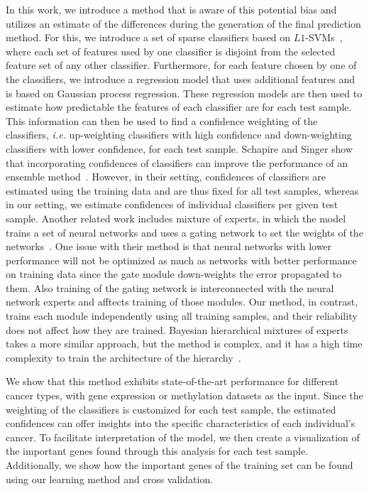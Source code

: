 In this work, we introduce a method that is aware of this potential bias and utilizes an estimate of the differences during the generation of the final prediction method. For this, we introduce a set of sparse classifiers based on $L1$-SVMs~\cite{bradley1998feature}, where each set of features used by one classifier is disjoint from the selected feature set of any other classifier. Furthermore, for each feature chosen by one of the classifiers, we introduce a regression model that uses additional features and is based on Gaussian process regression. These regression models are then used to estimate how predictable the features of each classifier are for each test sample. This information can then be used to find a confidence weighting of the classifiers, \emph{i.e.} up-weighting classifiers with high confidence and down-weighting classifiers with lower confidence, for each test sample. Schapire and Singer show that incorporating confidences of classifiers can improve the performance of an ensemble method~\cite{adaboost99improved}. However, in their setting, confidences of classifiers are estimated using the training data and are thus fixed for all test samples, whereas in our setting, we estimate confidences of individual classifiers per given test sample. Another related work includes mixture of experts, in which the model trains a set of neural networks and uses a gating network to set the weights of the networks~\cite{jacobs1991adaptive}. One issue with their method is that neural networks with lower performance will not be optimized as much as networks with better performance on training data since the gate module down-weights the error propagated to them. Also training of the gating network is interconnected with the neural network experts and afftects training of those modules. Our method, in contrast, trains each module independently using all training samples, and their reliability does not affect how they are trained. Bayesian hierarchical mixtures of experts takes a more similar approach, but the method is complex, and it has a high time complexity to train the architecture of the hierarchy~\cite{bishop2002bayesian}.

We show that this method exhibits state-of-the-art performance for different cancer types, with gene expression or methylation datasets as the input. Since the weighting of the classifiers is customized for each test sample, the estimated confidences can offer insights into the specific characteristics of each individual's cancer. To facilitate interpretation of the model, we then create a visualization of the important genes found through this analysis for each test sample. Additionally, we show how the important genes of the training set can be found using our learning method and cross validation.


